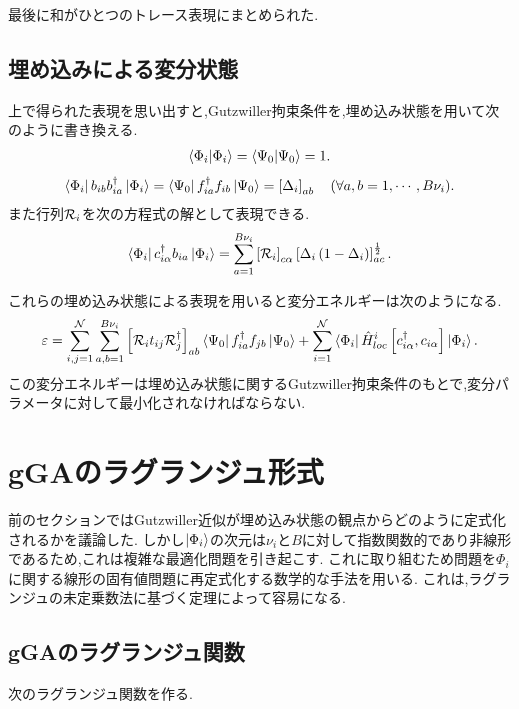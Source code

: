 最後に和がひとつのトレース表現にまとめられた.

\subsection{埋め込みによる変分状態}
上で得られた表現を思い出すと,Gutzwiller拘束条件を,埋め込み状態を用いて次のように書き換える.
\begin{align}
    \braket{\Phi_{i}}=\braket{\Psi_{0}}=1.
\end{align}
\begin{equation}
    \Bra{\Phi_{i}}b_{ib}b^\dagger_{ia}\Ket{\Phi_{i}}=\Bra{\Psi_{0}}f^\dagger_{ia}f_{ib}\Ket{\Psi_{0}}=\left[ \Delta_{i} \right]_{ab} \quad (\forall a,b=1,\cdots,B\nu_{i}).
\end{equation}
また行列$\mathcal{R}_{i}$を次の方程式の解として表現できる.
\begin{equation}
    \Bra{\Phi_{i}}c^\dagger_{i\alpha}b_{ia}\Ket{\Phi_{i}}=\sum_{a=1}^{B\nu_{i}}\left[ \mathcal{R}_{i} \right]_{c\alpha}\left[ \Delta_{i}\left( 1-\Delta_{i} \right) \right]^{\frac{1}{2}}_{ac}.
\end{equation}

これらの埋め込み状態による表現を用いると変分エネルギーは次のようになる.
\begin{equation}
    \varepsilon=\sum_{i,j=1}^{\mathcal{N}}\sum_{a,b=1}^{B\nu_{i}}\left[ \mathcal{R}_{i}t_{ij}\mathcal{R}^\dagger_{j} \right]_{ab}\Bra{\Psi_{0}}f^\dagger_{ia}f_{jb}\Ket{\Psi_{0}}+\sum_{i=1}^{\mathcal{N}}\Bra{\Phi_{i}}\hat{H}^{i}_{loc}\left[ c^\dagger_{i\alpha},c_{i\alpha} \right]\Ket{\Phi_{i}}.
\end{equation}
この変分エネルギーは埋め込み状態に関するGutzwiller拘束条件のもとで,変分パラメータに対して最小化されなければならない.

\section{gGAのラグランジュ形式}
前のセクションではGutzwiller近似が埋め込み状態の観点からどのように定式化されるかを議論した.
しかし$\Ket{\Phi_{i}}$の次元は$\nu_{i}$と$B$に対して指数関数的であり非線形であるため,これは複雑な最適化問題を引き起こす.
これに取り組むため問題を$\Phi_{i}$に関する線形の固有値問題に再定式化する数学的な手法を用いる.
これは,ラグランジュの未定乗数法に基づく定理によって容易になる.

\subsection{gGAのラグランジュ関数}
次のラグランジュ関数を作る.

